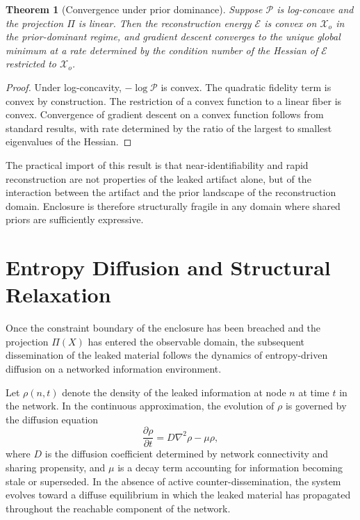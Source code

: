 \documentclass[12pt, oneside]{article}
\theoremstyle{plain}
\newtheorem{theorem}{Theorem}[section]
\theoremstyle{definition}
\theoremstyle{remark}
\newcommand{\proj}{\Pi}
\newcommand{\energy}{\mathcal{E}}
\newcommand{\config}{\mathcal{X}}
\newcommand{\prior}{\mathcal{P}}
\begin{document}
\begin{theorem}[Convergence under prior dominance]
Suppose $\prior$ is log-concave and the projection $\proj$ is linear. Then the reconstruction
energy $\energy$ is convex on $\config_o$ in the prior-dominant regime, and gradient descent
converges to the unique global minimum at a rate determined by the condition number of the
Hessian of $\energy$ restricted to $\config_o$.
\end{theorem}

\begin{proof}
Under log-concavity, $-\log \prior$ is convex. The quadratic fidelity term is convex by
construction. The restriction of a convex function to a linear fiber is convex. Convergence
of gradient descent on a convex function follows from standard results, with rate determined
by the ratio of the largest to smallest eigenvalues of the Hessian.
\end{proof}

The practical import of this result is that near-identifiability and rapid reconstruction
are not properties of the leaked artifact alone, but of the interaction between the artifact
and the prior landscape of the reconstruction domain. Enclosure is therefore structurally
fragile in any domain where shared priors are sufficiently expressive.

\section{Entropy Diffusion and Structural Relaxation}

Once the constraint boundary of the enclosure has been breached and the projection $\proj(X)$
has entered the observable domain, the subsequent dissemination of the leaked material
follows the dynamics of entropy-driven diffusion on a networked information environment.

Let $\rho(n, t)$ denote the density of the leaked information at node $n$ at time $t$ in
the network. In the continuous approximation, the evolution of $\rho$ is governed by the
diffusion equation
\[
  \frac{\partial \rho}{\partial t} = D \nabla^2 \rho - \mu \rho,
\]
where $D$ is the diffusion coefficient determined by network connectivity and sharing
propensity, and $\mu$ is a decay term accounting for information becoming stale or
superseded. In the absence of active counter-dissemination, the system evolves toward a
diffuse equilibrium in which the leaked material has propagated throughout the reachable
component of the network.
\end{document}
